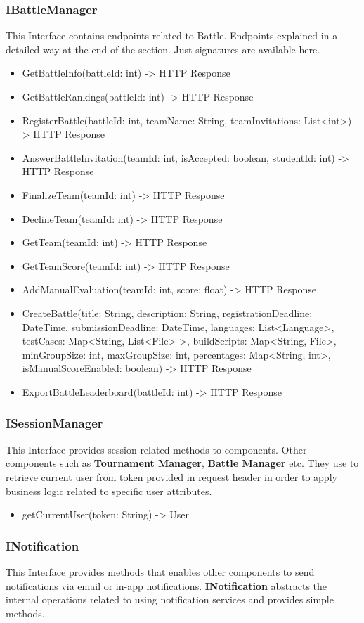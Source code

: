 \subsubsection{IBattleManager}
This Interface contains endpoints related to Battle. Endpoints explained in a detailed way at the end of the section. Just signatures are available here.
\begin{itemize}
\item GetBattleInfo(battleId: int) -> HTTP Response
\item GetBattleRankings(battleId: int) -> HTTP Response
\item RegisterBattle(battleId: int, teamName: String, teamInvitations: List<int>) -> HTTP Response 
\item AnswerBattleInvitation(teamId: int, isAccepted: boolean, studentId: int) -> HTTP Response
\item FinalizeTeam(teamId: int) -> HTTP Response
\item DeclineTeam(teamId: int) -> HTTP Response
\item GetTeam(teamId: int) -> HTTP Response
\item GetTeamScore(teamId: int) -> HTTP Response
\item AddManualEvaluation(teamId: int, score: float) -> HTTP Response
\item CreateBattle(title: String, description: String, registrationDeadline: DateTime, submissionDeadline: DateTime, languages: List<Language>, testCases: Map<String, List<File> >, buildScripts: Map<String, File>, minGroupSize: int, maxGroupSize: int, percentages: Map<String, int>, isManualScoreEnabled: boolean) -> HTTP Response 
\item ExportBattleLeaderboard(battleId: int) -> HTTP Response
\end{itemize}

\subsubsection{ISessionManager}
This Interface provides session related methods to components. Other components such as \textbf{Tournament Manager}, \textbf{Battle Manager} etc. They use to retrieve current user from token provided in request header in order to apply business logic related to specific user attributes.
\begin{itemize}
    \item getCurrentUser(token: String) -> User
\end{itemize}
\subsubsection{INotification}
This Interface provides methods that enables other components to send notifications via email or in-app notifications. \textbf{INotification} abstracts the internal operations related to using notification services and provides simple methods.

